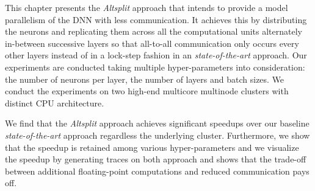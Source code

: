 This chapter presents the \emph{Altsplit} approach that intends to provide a
model parallelism of the DNN with less communication. It achieves this by
distributing the neurons and replicating them across all the computational
units alternately in-between successive layers so that all-to-all
communication only occurs every other layers instead of in a lock-step
fashion in an \emph{state-of-the-art} approach. Our experiments are conducted taking
multiple hyper-parameters into consideration: the number of neurons per
layer, the number of layers and batch sizes. We conduct the experiments on
two high-end multicore multinode clusters with distinct CPU architecture.

We find that the \emph{Altsplit} approach achieves significant speedups over
our baseline \emph{state-of-the-art} approach regardless the underlying cluster.
Furthermore, we show that the speedup is retained among various
hyper-parameters and we visualize the speedup by generating traces on both
approach and shows that the trade-off between additional floating-point 
computations and reduced communication pays off.
